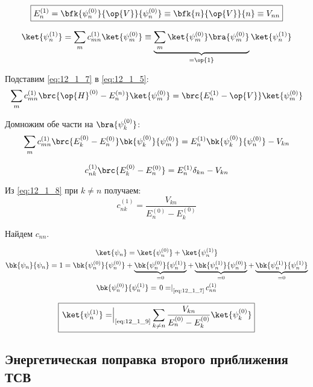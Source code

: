 \begin{equation}
\label{eq:12_1_7}
\boxed{E_n^{(1)} = \bfk{\psi_n^{(0)}}{\op{V}}{\psi_n^{(0)}} \equiv \bfk{n}{\op{V}}{n} \equiv V_{nn}}
\end{equation}

$$
\ket{\psi_n^{(1)}} = \sum_m c_{mn}^{(1)} \ket{\psi_m^{(0)}} \equiv \underbrace{\sum_m \ket{\psi_m^{(0)}} \bra{\psi_m^{(0)}}}_{=\op{1}} \ket{\psi_n^{(1)}}
$$

Подставим \eqref{eq:12_1_7} в \eqref{eq:12_1_5}:
$$
\sum_m c_{mn}^{(1)} \brc{\op{H}^{(0)} - E_n^{(n)}}\ket{\psi_m^{(0)}} = \brc{E_n^{(1)} - \op{V}}\ket{\psi_m^{(0)}}
$$

Домножим обе части на $\bra{\psi_k^{(0)}}$:
$$
\sum_m c_{mn}^{(1)}\brc{E_k^{(0)} - E_n^{(0)}} \bk{\psi_k^{(0)}}{\psi_m^{(0)}} = E_n^{(1)} \bk{\psi_k^{(0)}}{\psi_n^{(0)}} - V_{kn}
$$

\begin{equation}
\label{eq:12_1_8}
c_{nk}^{(1)} \brc{E_k^{(0)} - E_n^{(0)}} = E_n^{(1)} \delta_{kn} - V_{kn}
\end{equation}

Из \eqref{eq:12_1_8} при $k \neq n$ получаем:
\begin{equation}
\label{eq:12_1_9}
c_{nk}^{(1)} = \frac{V_{kn}}{E_n^{(0)} - E_k^{(0)}}
\end{equation}

Найдем $c_{nn}$.

\begin{gather*}
\ket{\psi_n} = \ket{\psi_n^{(0)}} + \ket{\psi_n^{(1)}}\\
\bk{\psi_n}{\psi_n} = 1 = \bk{\psi_n^{(0)}}{\psi_n^{(0)}} + \underbrace{\bk{\psi_n^{(0)}}{\psi_n^{(1)}}}_{=0} + \underbrace{\bk{\psi_n^{(1)}}{\psi_n^{(0)}}}_{=0} + \underbrace{\bk{\psi_n^{(1)}}{\psi_n^{(1)}}}_{=0}\\
\bk{\psi_n^{(0)}}{\psi_n^{(1)}} = \left. 0 = \right|_{\text{\eqref{eq:12_1_7}}} c_{nn}^{(1)} 
\end{gather*}

\begin{equation}
\label{eq:12_1_10}
\boxed{\left. \ket{\psi_n^{(1)}}= \right|_{\text{\eqref{eq:12_1_9}}} \sum_{k \neq n} \frac{V_{kn}}{E_n^{(0)} - E_k^{(0)}} \ket{\psi_k^{(0)}}}
\end{equation}

\subsection{Энергетическая поправка второго приближения ТСВ}

